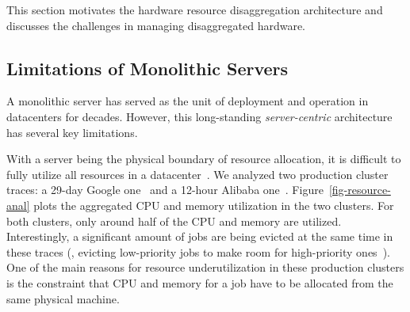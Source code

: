 \documentclass[10pt,times,twocolumn]{z2-article}
\begin{document}
This section %
motivates the hardware resource disaggregation architecture
and discusses the challenges in managing disaggregated hardware.

\subsection{Limitations of Monolithic Servers}
\label{sec:monolimit}
A monolithic server has served as the unit of deployment and operation in datacenters
for decades. %
However, this long-standing {\em server-centric} architecture has several key limitations.

With a server being the physical boundary of resource allocation, 
it is difficult to fully utilize all resources in a datacenter~\cite{Barroso-COMPUTER,Quasar-ASPLOS,PowerNap}.
We analyzed two production cluster traces: a 29-day Google one~\cite{GoogleTrace}
and a 12-hour Alibaba one~\cite{AliTrace}.
Figure~\ref{fig-resource-anal} plots the aggregated CPU and memory utilization in the two clusters.
For both clusters, only around half of the CPU and memory are utilized.
Interestingly, %
a significant amount of jobs are being evicted at the same time in these traces
(\eg, evicting low-priority jobs to make room for high-priority ones~\cite{Borg}). %
One of the main reasons for resource underutilization in these production clusters is 
the constraint that CPU and memory for a job have to be allocated from 
the same physical machine.
\end{document}
